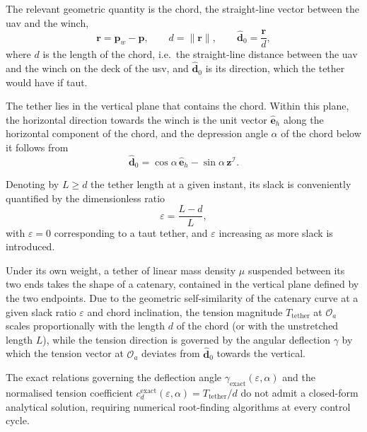 The relevant geometric quantity is the chord, the straight-line vector between the \gls{uav} and the winch,
\begin{equation}
    \mathbf{r} = \mathbf{p}_w - \mathbf{p}, \qquad d = \|\mathbf{r}\|, \qquad \hat{\mathbf{d}}_0 = \frac{\mathbf{r}}{d},
    \label{eq:uav_tether_geometry}
\end{equation}
where $d$ is the length of the chord, i.e.\ the straight-line distance between the \gls{uav} and the winch on the deck of the \gls{usv}, and $\hat{\mathbf{d}}_0$ is its direction, which the tether would have if taut.

The tether lies in the vertical plane that contains the chord. Within this plane, the horizontal direction towards the winch is the unit vector $\hat{\mathbf{e}}_h$ along the horizontal component of the chord, and the depression angle $\alpha$ of the chord below it follows from
\begin{equation}
    \hat{\mathbf{d}}_0 = \cos\alpha\,\hat{\mathbf{e}}_h - \sin\alpha\,\mathbf{z}^{\mathcal{I}}.
    \label{eq:uav_tether_alpha}
\end{equation}

Denoting by $L \geq d$ the tether length at a given instant, its slack is conveniently quantified by the dimensionless ratio
\begin{equation}
    \varepsilon = \frac{L - d}{L},
    \label{eq:uav_tether_slack}
\end{equation}
with $\varepsilon = 0$ corresponding to a taut tether, and $\varepsilon$ increasing as more slack is introduced.

Under its own weight, a tether of linear mass density $\mu$ suspended between its two ends takes the shape of a catenary, contained in the vertical plane defined by the two endpoints. Due to the geometric self-similarity of the catenary curve at a given slack ratio $\varepsilon$ and chord inclination, the tension magnitude $T_{\mathrm{tether}}$ at $\mathcal{O}_a$ scales proportionally with the length $d$ of the chord (or with the unstretched length $L$), while the tension direction is governed by the angular deflection $\gamma$ by which the tension vector at $\mathcal{O}_a$ deviates from $\hat{\mathbf{d}}_0$ towards the vertical.

The exact relations governing the deflection angle $\gamma_{\mathrm{exact}}(\varepsilon,\alpha)$ and the normalised tension coefficient $c_d^{\mathrm{exact}}(\varepsilon,\alpha) = T_{\mathrm{tether}}/d$ do not admit a closed-form analytical solution, requiring numerical root-finding algorithms at every control cycle.

